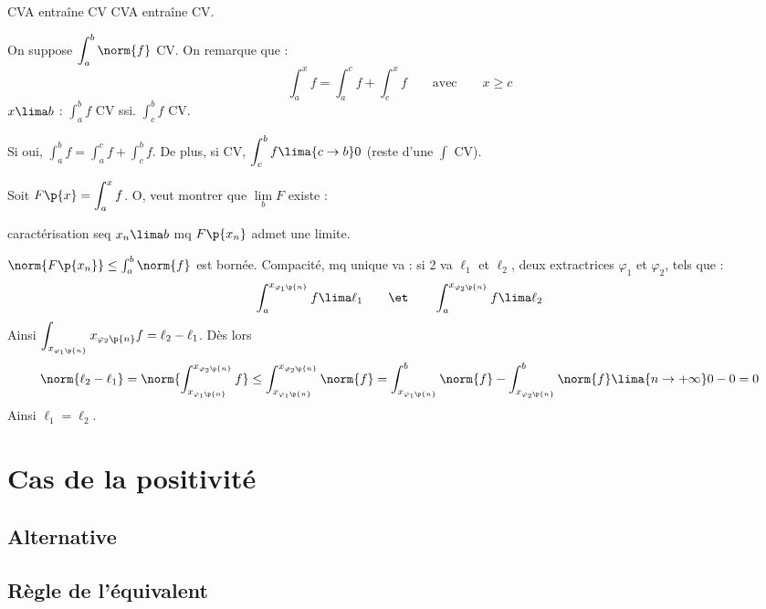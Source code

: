 \documentclass[a4paper,french,bookmarks]{book}
\begin{document}
    \begin{property}{CVA entraîne CV}{}
        CVA entraîne CV.
    \end{property}
    \begin{nproof}
        On suppose $\displaystyle\int_a^b \norm{f}$ CV. On remarque que :
        \[ \int_a^x f = \int_a^c f + \int_c^x f \qquad\text{avec}\qquad x \geq c\]
        $x \lima b$ : $\displaystyle \int_a^b f $ CV ssi. $\displaystyle\int_c^b f$ CV.
        
        Si oui, $\displaystyle\int_a^b f = \int_a^c f + \int_c^b f$. De plus, si CV, $\displaystyle\int_c^b f \lima{c \to b} 0$ (reste d'une $\int$ CV).
        
        Soit $F\p{x} = \displaystyle\int_a^x f$. O, veut montrer que $\lim\limits_b F$ existe :
        
        caractérisation seq $x_n \lima b$ mq $F\p{x_n}$ admet une limite.
        
        $\norm{F\p{x_n}} \leq \int_a^b \norm{f}$ est bornée. Compacité, mq unique va : si 2 va $\ell_1$ et $\ell_2$, deux extractrices $\varphi_1$ et $\varphi_2$, tels que :
        \[ \int_a^{x_{\varphi_1\p{n}}} f \lima \ell_1 \qquad\et\qquad \int_a^{x_{\varphi_2\p{n}}} f \lima \ell_2\]
        Ainsi $\displaystyle\int_{x_{\varphi_1\p{n}}}{x_{\varphi_2\p{n}}} f = \ell_2 - \ell_1$. Dès lors 
        \[ \norm{\ell_2 - \ell_1} = \norm{\int_{x_{\varphi_1\p{n}}}^{x_{\varphi_2\p{n}}} f} \leq \int_{x_{\varphi_1\p{n}}}^{x_{\varphi_2\p{n}}} \norm{f} = \int_{x_{\varphi_1\p{n}}}^b \norm{f} - \int_{x_{\varphi_2\p{n}}}^b \norm{f} \lima{n \to +\infty} 0 - 0 = 0\]
        Ainsi $\ell_1 = \ell_2$.
    \end{nproof}
    
    \section{Cas de la positivité}
    
    \subsection{Alternative}
    
    \subsection{}
    
    \subsection{Règle de l'équivalent}
    
\end{document}
